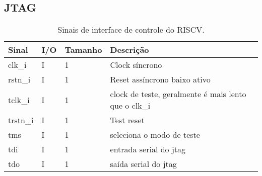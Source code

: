 \subsection{JTAG}
\label{sec:jtag}
\begin{table}[H]
  \centering
  \renewcommand\arraystretch{1.25}
  \caption{Sinais de interface de controle do RISCV.}
  \vspace{2mm}
  \begin{tabular}{|P{4.0cm}|P{0.7cm}|P{1.5cm}|P{8cm}|}
    \hline
    \textbf{Sinal}        & \textbf{I/O} & \textbf{Tamanho} & \textbf{Descrição}                                    \\ \hline
    clk\_i                 & I            & 1                & Clock síncrono                                       \\ \hline
    rstn\_i                & I            & 1                & Reset assíncrono baixo ativo                          \\ \hline
    tclk\_i                 & I            & 1                & clock de teste, geralmente é mais lento que o clk\_i \\ \hline
    trstn\_i                & I            & 1                & Test reset \\ \hline
    tms               & I            & 1    & seleciona o modo de teste \\ \hline
       tdi              & I            & 1    & entrada serial do jtag \\ \hline
     tdo              & I            & 1    & saída serial do jtag \\ \hline

\end{tabular} 
\end{table}
